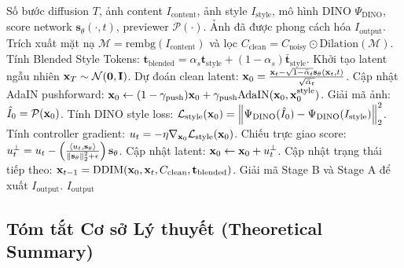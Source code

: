 \documentclass[runningheads]{llncs}
\begin{document}
\begin{algorithm}[t]
\caption{Thuật toán sinh ảnh của \method}
\label{alg:orthostyle}
\begin{algorithmic}[1]
\REQUIRE Số bước diffusion $T$, ảnh content $I_{\text{content}}$, ảnh style $I_{\text{style}}$, mô hình DINO $\Psi_{\text{DINO}}$, score network $\mathbf{s}_\theta(\cdot, t)$, previewer $\mathcal{P}(\cdot)$.
\ENSURE Ảnh đã được phong cách hóa $I_{\text{output}}$.
\STATE Trích xuất mặt nạ $\mathcal{M} = \text{rembg}(I_{\text{content}})$ và lọc $C_{\text{clean}} = C_{\text{noisy}} \odot \text{Dilation}(\mathcal{M})$.
\STATE Tính Blended Style Tokens: $\mathbf{t}_{\text{blended}} = \alpha_s \mathbf{t}_{\text{style}} + (1 - \alpha_s) \bar{\mathbf{t}}_{\text{style}}$.
\STATE Khởi tạo latent ngẫu nhiên $\mathbf{x}_T \sim \mathcal{N}(\mathbf{0}, \mathbf{I})$.
    \STATE Dự đoán clean latent: $\mathbf{x}_0 = \frac{\mathbf{x}_t - \sqrt{1 - \bar{\alpha}_t}\mathbf{s}_\theta(\mathbf{x}_t, t)}{\sqrt{\bar{\alpha}_t}}$.
        \STATE Cập nhật AdaIN pushforward: $\mathbf{x}_0 \leftarrow (1 - \gamma_{\text{push}}) \mathbf{x}_0 + \gamma_{\text{push}} \text{AdaIN}(\mathbf{x}_0, \mathbf{x}_0^{\text{style}})$.
    \ENDIF
        \STATE Giải mã ảnh: $\hat{I}_0 = \mathcal{P}(\mathbf{x}_0)$.
        \STATE Tính DINO style loss: $\mathcal{L}_{\text{style}}(\mathbf{x}_0) = \left\lVert\Psi_{\text{DINO}}(\hat{I}_0) - \Psi_{\text{DINO}}(I_{\text{style}})\right\rVert_2^2$.
        \STATE Tính controller gradient: $u_t = -\eta \nabla_{\mathbf{x}_0} \mathcal{L}_{\text{style}}(\mathbf{x}_0)$.
        \STATE Chiếu trực giao score: $u_t^\perp = u_t - \left( \frac{\left\langle u_t, \mathbf{s}_\theta \right\rangle}{\left\lVert\mathbf{s}_\theta\right\rVert_2^2 + \epsilon} \right) \mathbf{s}_\theta$.
        \STATE Cập nhật latent: $\mathbf{x}_0 \leftarrow \mathbf{x}_0 + u_t^\perp$.
    \ENDIF
    \STATE Cập nhật trạng thái tiếp theo: $\mathbf{x}_{t-1} = \text{DDIM}(\mathbf{x}_0, \mathbf{x}_t, C_{\text{clean}}, \mathbf{t}_{\text{blended}})$.
\ENDFOR
\STATE Giải mã Stage B và Stage A để xuất $I_{\text{output}}$.
\RETURN $I_{\text{output}}$
\end{algorithmic}
\end{algorithm}

\subsection{Tóm tắt Cơ sở Lý thuyết (Theoretical Summary)}
\label{subsec:theory_summary}
\end{document}
